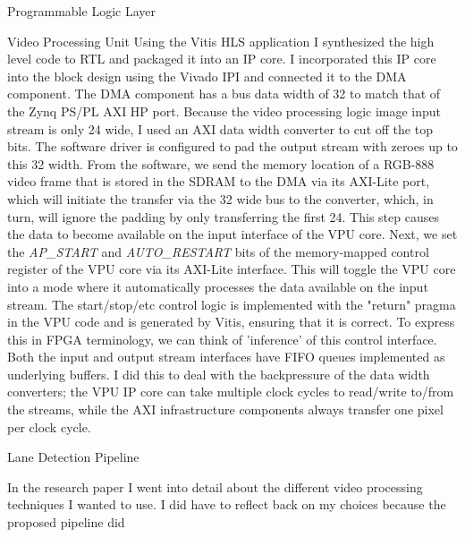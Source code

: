 \documentclass{matthijs}
\begin{document}
\begin{hoofdstuk}{Programmable Logic Layer}
\begin{paragraaf}{Video Processing Unit}
			Using the Vitis HLS application I synthesized the high level code to RTL and packaged it into an IP core.
			I incorporated this IP core into the block design using the Vivado IPI and connected it to the DMA component.
			The DMA component has a bus data width of \qty{32}{\bit} to match that of the Zynq PS/PL AXI HP port.
			Because the video processing logic image input stream is only \qty{24}{\bit} wide, I used an AXI data width converter to cut off the top bits.
			The software driver is configured to pad the output stream with zeroes up to this \qty{32}{\bit} width.
			From the software, we send the memory location of a RGB-888 video frame that is stored in the SDRAM to the DMA via its AXI-Lite port, which will initiate the transfer via the \qty{32}{\bit} wide bus to the converter, which, in turn, will ignore the padding by only transferring the first \qty{24}{\bit}.
			This step causes the data to become available on the input interface of the VPU core.
			Next, we set the \textit{AP\_START} and \textit{AUTO\_RESTART} bits of the memory-mapped control register of the VPU core via its AXI-Lite interface.
			This will toggle the VPU core into a mode where it automatically processes the data available on the input stream.
			The start/stop/etc control logic is implemented with the "return" pragma in the VPU code and is generated by Vitis, ensuring that it is correct.
			To express this in FPGA terminology, we can think of 'inference' of this control interface.
			Both the input and output stream interfaces have FIFO queues implemented as underlying buffers.
			I did this to deal with the backpressure of the data width converters; the VPU IP core can take multiple clock cycles to read/write to/from the streams, while the AXI infrastructure components always transfer one pixel per clock cycle.

		\end{paragraaf}

		\clearpage

		\begin{paragraaf}{Lane Detection Pipeline}

			In the research paper I went into detail about the different video processing techniques I wanted to use.
			I did have to reflect back on my choices because the proposed pipeline did
			\begin{figure}
				\centering
					\vspace{-1ex}
					\begin{tikzpicture}


\end{tikzpicture}
\end{figure}
\end{paragraaf}
\end{hoofdstuk}
\end{document}
